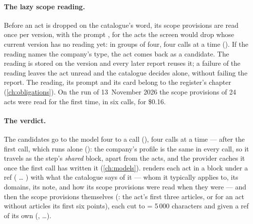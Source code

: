 \paragraph{The lazy scope reading.} Before an act is dropped on the catalogue's word, its scope
provisions are read once per version, with the prompt , for the acts the
screen would drop whose current version has no reading yet: in groups of four, four calls at a
time (). If the reading names the company's type, the act comes back as a
candidate. The reading is stored on the version and every later report reuses it; a failure of
the reading leaves the act unread and the catalogue decides alone, without failing the report.
The reading, its prompt and its card belong to the register's chapter (\cref{ch:obligations}).
On the run of 13~November 2026 the scope provisions of 24 acts were read for the first time, in
six calls, for \$0.16.

\paragraph{The verdict.} The candidates go to the model four to a call (),
four calls at a time --- after the first call, which runs alone (): the
company's profile is the same in every call, so it travels as the step's \emph{shared} block,
apart from the acts, and the provider caches it once the first call has written it
(\cref{ch:models}).  renders each act in a block under a ref
( \ldots{} ) with what the catalogue says of it --- whom it typically applies
to, its domains, its note, and how its scope provisions were read when they were --- and then
the scope provisions themselves (: the act's first three articles, or
for an act without articles its first six points), each cut to  = 5\,000
characters and given a ref of its own (, \ldots).

